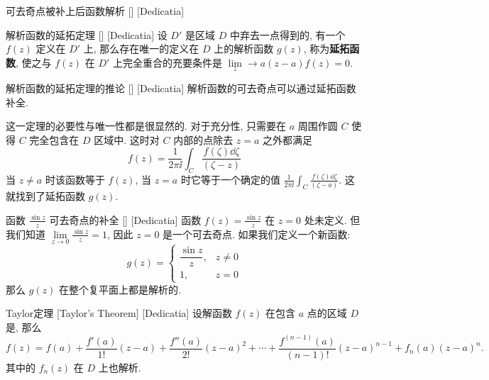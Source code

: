 \documentclass[UTF8]{ctexart}
\begin{document}
        \begin{ppt}
            []
            {可去奇点被补上后函数解析}
            []
            [Dedicatia]
        \end{ppt}

        \begin{thm}
            [UUID]
            {解析函数的延拓定理}
            []
            [Dedicatia]
            设 \(D'\) 是区域 \(D\) 中弃去一点得到的, 有一个  \(f(z)\) 定义在 \(D'\) 上, 那么存在唯一的定义在 \(D\) 上的解析函数 \(g(z)\), 称为\textbf{延拓函数}, 使之与 \(f(z)\) 在 \(D'\) 上完全重合的充要条件是 \(\lim\limits_z\to a(z-a)f(z)=0\).
        \end{thm}

        \begin{crl}
            [UUID]
            {解析函数的延拓定理的推论}
            []
            [Dedicatia]
            解析函数的可去奇点可以通过延拓函数补全. 
        \end{crl}

        \begin{prf}
            这一定理的必要性与唯一性都是很显然的. 对于充分性, 只需要在 \(a\) 周围作圆 \(C\) 使得 \(C\) 完全包含在 \(D\) 区域中. 这时对 \(C\) 内部的点除去 \(z=a\) 之外都满足
            \[f(z)=\frac{1}{2\pi\ii}\int_C \frac{f(\zeta)\dd{\zeta}}{(\zeta-z)}\]
            当 \(z\neq a\) 时该函数等于 \(f(z)\), 当 \(z=a\) 时它等于一个确定的值 \(\frac{1}{2\pi\ii}\int_C \frac{f(\zeta)\dd{\zeta}}{(\zeta-a)}\). 这就找到了延拓函数 \(g(z)\).
        \end{prf}

        \begin{xmp}
            [UUID]
            {函数 \(\frac{\sin z}{z}\) 可去奇点的补全}
            []
            [Dedicatia]
            函数 \(f(z) = \frac{\sin z}{z}\) 在 \(z = 0\) 处未定义. 但我们知道 \(\lim\limits_{z \to 0} \frac{\sin z}{z} = 1\), 因此 \(z=0\) 是一个可去奇点. 如果我们定义一个新函数: 
            \[
            g(z) = \begin{cases}
            \dfrac{\sin z}{z}, & z \neq 0 \\
            1, & z = 0
            \end{cases}
            \]
            那么 \(g(z)\) 在整个复平面上都是解析的. 
        \end{xmp}

        \begin{thm}
            [Taylor]
            {Taylor定理\label{thm:Taylor}}
            [Taylor's Theorem]
            [Dedicatia]
            设解函数 \(f(z)\) 在包含 \(a\) 点的区域 \(D\) 是, 那么
            \[f(z)=f(a)+\frac{f'(a)}{1!}(z-a)+\frac{f''(a)}{2!}(z-a)^2+\cdots+\frac{f^{(n-1)}(a)}{(n-1)!}(z-a)^{n-1}+f_n(a)(z-a)^n.\]
            其中的 \(f_n(z)\) 在 \(D\) 上也解析. 
        \end{thm}
\end{document}
